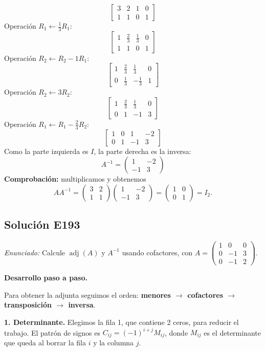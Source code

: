 \documentclass[12pt]{article}
\theoremstyle{remark}
\newcommand{\adj}{\operatorname{adj}}
\newcommand{\solucion}[2]{\Needspace{11\baselineskip}\subsection*{Solución E#1}\noindent\textit{Enunciado:} #2\par\medskip\noindent\textbf{Desarrollo paso a paso.}\par\medskip}
\begin{document}
\[
\left[\begin{array}{rr|rr}3&2&1&0\\1&1&0&1\end{array}\right]
\]
Operación $R_{1}\leftarrow \frac{1}{3}R_{1}$:
\[
\left[\begin{array}{rr|rr}1&\frac{2}{3}&\frac{1}{3}&0\\1&1&0&1\end{array}\right]
\]
Operación $R_{2}\leftarrow R_{2}-1R_{1}$:
\[
\left[\begin{array}{rr|rr}1&\frac{2}{3}&\frac{1}{3}&0\\0&\frac{1}{3}&- \frac{1}{3}&1\end{array}\right]
\]
Operación $R_{2}\leftarrow 3R_{2}$:
\[
\left[\begin{array}{rr|rr}1&\frac{2}{3}&\frac{1}{3}&0\\0&1&-1&3\end{array}\right]
\]
Operación $R_{1}\leftarrow R_{1}-\frac{2}{3}R_{2}$:
\[
\left[\begin{array}{rr|rr}1&0&1&-2\\0&1&-1&3\end{array}\right]
\]
Como la parte izquierda es $I$, la parte derecha es la inversa:
\[
\boxed{A^{-1}=\begin{pmatrix}1&-2\\-1&3\end{pmatrix}}
\]
\textbf{Comprobación:} multiplicamos y obtenemos
\[
AA^{-1}=\begin{pmatrix}3&2\\1&1\end{pmatrix}\begin{pmatrix}1&-2\\-1&3\end{pmatrix}=\begin{pmatrix}1&0\\0&1\end{pmatrix}=I_{2}.
\]

\medskip

\solucion{193}{Calcule $\adj(A)$ y $A^{-1}$ usando cofactores, con $A=\begin{pmatrix}1&0&0\\0&-1&3\\0&-1&2\end{pmatrix}$.}
Para obtener la adjunta seguimos el orden: \textbf{menores $\to$ cofactores $\to$ transposición $\to$ inversa}.

\textbf{1. Determinante.}
Elegimos la fila 1, que contiene 2 ceros, para reducir el trabajo. El patrón de signos es $C_{ij}=(-1)^{i+j}M_{ij}$, donde $M_{ij}$ es el determinante que queda al borrar la fila $i$ y la columna $j$.
\end{document}
